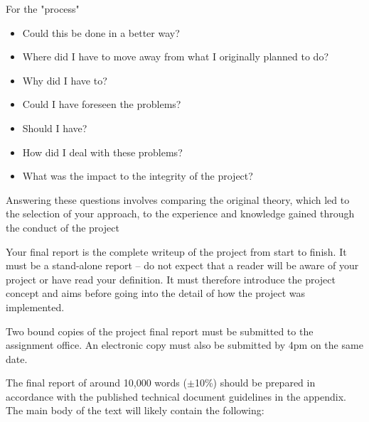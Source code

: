 For the "process"

\begin{itemize}
    \item Could this be done in a better way?
    \item Where did I have to move away from what I originally planned to do?
    \item Why did I have to? 
    \item Could I have foreseen the problems?
    \item Should I have?
    \item How did I deal with these problems? 
    \item What was the impact to the integrity of the project?
\end{itemize}

Answering these questions involves comparing the original theory, which led to the selection of your approach, to the experience and knowledge gained through the conduct of the project

Your final report is the complete writeup of the project from start to finish. It must be a stand-alone
report – do not expect that a reader will be aware of your project or have read your definition. It
must therefore introduce the project concept and aims before going into the detail of how the project
was implemented.

\begin{tcolorbox}
    Two bound copies of the project final report must be submitted to the assignment office. An electronic copy must also be submitted by 4pm on the same date.
\end{tcolorbox}

The final report of around 10,000 words ($\pm$10\%) should be prepared in accordance with the published technical document guidelines in the appendix. The main body of the text will likely contain the following: 


